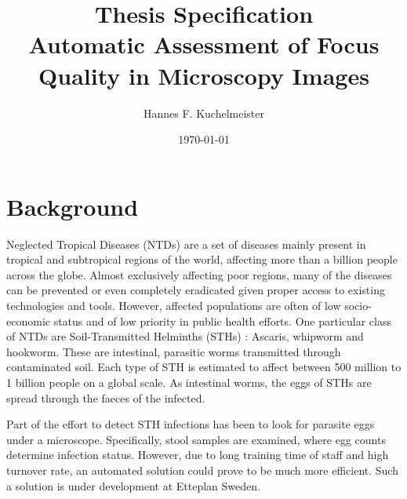 \documentclass[a4paper,11pt]{article}
\title{\textbf{Thesis Specification} \\ Automatic Assessment of Focus Quality in Microscopy Images}
\author{Hannes F. Kuchelmeister}
\date{\today}
\begin{document}
\begin{titlepage}
\maketitle



\thispagestyle{empty}
\newpage
\end{titlepage}

\section{Background}


Neglected Tropical Diseases (NTDs) \cite{worldhealthorganization2021neglected} are a set of diseases mainly present in tropical and subtropical regions of the world, affecting more than a billion people across the globe. Almost exclusively affecting poor regions, many of the diseases can be prevented or even completely eradicated given proper access to existing technologies and tools. However, affected populations are often of low socio-economic status and of low priority in public health efforts. One particular class of NTDs are Soil-Transmitted Helminths (STHs) \cite{worldhealthorganization2020soiltransmitted}: Ascaris, whipworm and hookworm. These are intestinal, parasitic worms transmitted through contaminated soil. Each type of STH is estimated to affect between 500 million to 1 billion people on a global scale. As intestinal worms, the eggs of STHs are spread through the faeces of the infected. 

Part of the effort to detect STH infections has been to look for parasite eggs under a microscope. Specifically, stool samples are examined, where egg counts determine infection status. However, due to long training time of staff and high turnover rate, an automated solution could prove to be much more efficient. Such a solution is under development at Etteplan Sweden.
\end{document}
